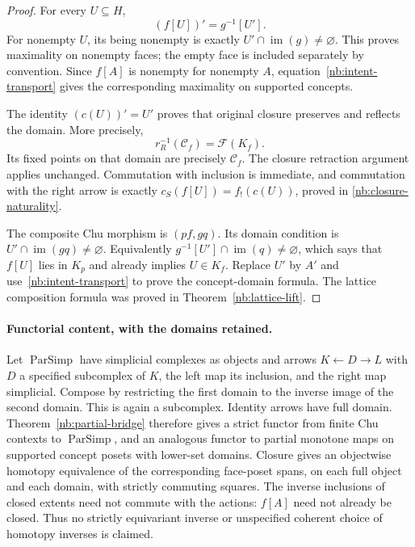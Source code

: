 \documentclass[11pt]{article}
\theoremstyle{remark}
\begin{document}
\begin{proof}
For every $U\subseteq H$,
\[
 (f[U])'=g^{-1}[U'].
\]
For nonempty $U$, its being nonempty is exactly
$U'\cap\operatorname{im}(g)\ne\varnothing$.
This proves maximality on nonempty faces; the empty face is included
separately by convention. Since $f[A]$ is nonempty for nonempty
$A$, equation~\eqref{nb:intent-transport} gives the corresponding
maximality on supported concepts.

The identity $(c(U))'=U'$ proves that original closure preserves and
reflects the domain. More precisely,
\[
 r_R^{-1}(\mathcal C_f)=\mathcal F(K_f).
\]
Its fixed points on that domain are precisely $\mathcal C_f$. The closure
retraction argument applies unchanged. Commutation with inclusion is
immediate, and commutation with the right arrow is exactly
$c_S(f[U])=f_!(c(U))$, proved in
\eqref{nb:closure-naturality}.

The composite Chu morphism is $(pf,gq)$. Its domain condition is
$U'\cap\operatorname{im}(gq)\ne\varnothing$. Equivalently
$g^{-1}[U']\cap\operatorname{im}(q)\ne\varnothing$, which says that
$f[U]$ lies in $K_p$ and already implies $U\in K_f$.
Replace $U'$ by $A'$ and use~\eqref{nb:intent-transport} to prove the
concept-domain formula. The lattice composition formula was proved in
Theorem~\ref{nb:lattice-lift}.
\end{proof}


\paragraph{Functorial content, with the domains retained.}
Let $\operatorname{ParSimp}$ have simplicial complexes as objects and arrows
$K\leftarrow D\to L$ with $D$ a specified subcomplex of $K$, the left
map its inclusion, and the right map simplicial. Compose by restricting
the first domain to the inverse image of the second domain. This is again
a subcomplex. Identity arrows have full domain. Theorem~\ref{nb:partial-bridge}
therefore gives a strict functor from finite Chu contexts to
$\operatorname{ParSimp}$, and an analogous functor to partial monotone maps
on supported concept posets with lower-set domains. Closure gives an
objectwise homotopy equivalence of the corresponding face-poset spans,
on each full object and each domain, with strictly commuting squares.
The inverse inclusions of closed extents need not commute with the actions:
$f[A]$ need not already be closed. Thus no strictly equivariant inverse or
unspecified coherent choice of homotopy inverses is claimed.
\end{document}
